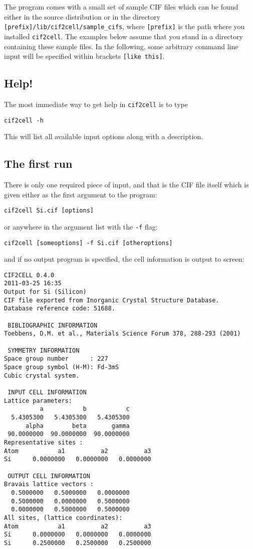 \documentclass[11pt]{article}
\newcommand{\ciftocell}{\texttt{cif2cell}}
\begin{document}
The program comes with a small set of sample CIF files which can be found either in the source distribution or in the directory \texttt{[prefix]/lib/cif2cell/sample\_cifs}, where \texttt{[prefix]} is the path where you installed \ciftocell. The examples below assume that you stand in a directory containing these sample files. In the following, some arbitrary command line input will be specified within brackets \texttt{[like this]}.

\subsection{Help!}
The most immediate way to get help in \ciftocell{} is to type
\begin{verbatim}
cif2cell -h
\end{verbatim}
This will list all available input options along with a description.

\subsection{The first run}
There is only one required piece of input, and that is the CIF file itself which is given either as the first argument to the program:
\begin{verbatim}
cif2cell Si.cif [options]
\end{verbatim}
or anywhere in the argument list with the \texttt{-f} flag:
\begin{verbatim}
cif2cell [someoptions] -f Si.cif [otheroptions]
\end{verbatim}
and if no output program is specified, the cell information is output to screen:

\newpage
\begin{verbatim}
CIF2CELL 0.4.0
2011-03-25 16:35
Output for Si (Silicon)
CIF file exported from Inorganic Crystal Structure Database.
Database reference code: 51688.

 BIBLIOGRAPHIC INFORMATION
Toebbens, D.M. et al., Materials Science Forum 378, 288-293 (2001) 

 SYMMETRY INFORMATION
Space group number      : 227
Space group symbol (H-M): Fd-3mS
Cubic crystal system.

 INPUT CELL INFORMATION
Lattice parameters:
          a           b           c 
  5.4305300   5.4305300   5.4305300 
      alpha        beta       gamma 
 90.0000000  90.0000000  90.0000000 
Representative sites :
Atom           a1          a2          a3 
Si      0.0000000   0.0000000   0.0000000

 OUTPUT CELL INFORMATION
Bravais lattice vectors :
  0.5000000   0.5000000   0.0000000 
  0.5000000   0.0000000   0.5000000 
  0.0000000   0.5000000   0.5000000 
All sites, (lattice coordinates):
Atom           a1          a2          a3 
Si      0.0000000   0.0000000   0.0000000
Si      0.2500000   0.2500000   0.2500000\end{verbatim}
\end{document}
